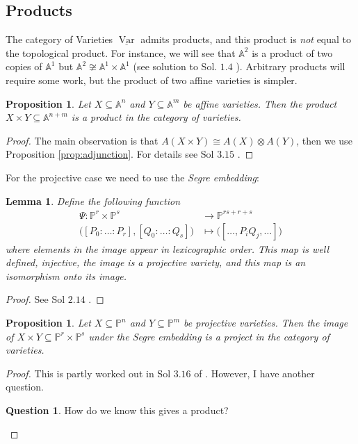 \documentclass[12pt]{article}
\theoremstyle{plain}
\newtheorem{proposition}[thm]{Proposition}
\newtheorem{lemma}[thm]{Lemma}
\theoremstyle{definition}
\newtheorem{question}[thm]{Question}
\newcommand{\bb}[1]{\mathbb{#1}}
\newcommand{\lto}{\longrightarrow}
\begin{document}
\subsection{Products}
The category of Varieties $\underline{\operatorname{Var}}$ admits products, and this product is \emph{not} equal to the topological product. For instance, we will see that $\bb{A}^2$ is a product of two copies of $\bb{A}^1$ but $\bb{A}^2 \not\cong \bb{A}^1 \times \bb{A}^1$ (see solution to Sol. $1.4$ \cite{hartshorne_solutions}). Arbitrary products will require some work, but the product of two affine varieties is simpler.
\begin{proposition}\label{prop:prod_affine_variety}
Let $X \subseteq \bb{A}^n$ and $Y \subseteq \bb{A}^m$ be affine varieties. Then the product $X \times Y \subseteq \bb{A}^{n+m}$ is a product in the category of varieties.
\end{proposition}
\begin{proof}
The main observation is that $A(X \times Y) \cong A(X) \otimes A(Y)$, then we use Proposition \ref{prop:adjunction}. For details see Sol $3.15$ \cite{hartshorne_solutions}.
\end{proof}
For the projective case we need to use the \emph{Segre embedding}:
\begin{lemma}
Define the following function
\begin{align}
    \Psi: \bb{P}^r \times \bb{P}^s &\lto \bb{P}^{rs + r + s}\\
    \big([P_0:\hdots:P_r],[Q_0:\hdots:Q_s]\big) &\longmapsto \big([\hdots, P_iQ_j,\hdots]\big)
\end{align}
where elements in the image appear in lexicographic order. This map is well defined, injective, the image is a projective variety, and this map is an isomorphism onto its image.
\end{lemma}
\begin{proof}
See Sol $2.14$ \cite{hartshorne_solutions}.
\end{proof}
\begin{proposition}
Let $X \subseteq \bb{P}^n$ and $Y \subseteq \bb{P}^m$ be projective varieties. Then the image of $X \times Y \subseteq \bb{P}^r \times \bb{P}^s$ under the Segre embedding is a project in the category of varieties.
\end{proposition}
\begin{proof}
This is partly worked out in Sol $3.16$ of \cite{hartshorne_solutions}. However, I have another question.
\begin{question}
	How do we know this gives a product?
	\end{question}
\end{proof}
\end{document}
